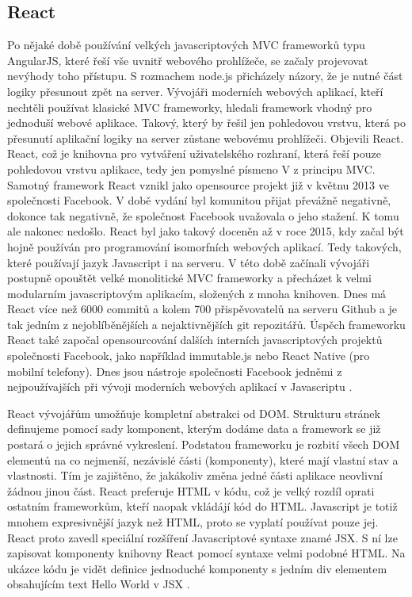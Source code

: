 \subsection{React}
\label{sec:react}
Po nějaké době používání velkých javascriptových MVC frameworků typu AngularJS, které řeší vše uvnitř webového prohlížeče, se začaly projevovat nevýhody toho přístupu. S rozmachem node.js přicházely názory, že je nutné část logiky přesunout zpět na server. Vývojáři moderních webových aplikací, kteří nechtěli používat klasické MVC frameworky, hledali framework vhodný pro jednoduší webové aplikace. Takový, který by řešil jen pohledovou vrstvu, která po přesunutí aplikační logiky na server zůstane webovému prohlížeči. Objevili React. React, což je knihovna pro vytváření uživatelského rozhraní, která řeší pouze pohledovou vrstvu aplikace, tedy jen pomyslné písmeno V z principu MVC. Samotný framework React vznikl jako opensource projekt již v květnu 2013 ve společnosti Facebook. V době vydání byl komunitou přijat převážně negativně, dokonce tak negativně, že společnost Facebook uvažovala o jeho stažení. K tomu ale nakonec nedošlo. React byl jako takový doceněn až v roce 2015, kdy začal být hojně používán pro programování isomorfních webových aplikací. Tedy takových, které používají jazyk Javascript i na serveru. V této době začínali vývojáři postupně opouštět velké monolitické MVC frameworky a přecházet k velmi modularním javascriptovým aplikacím, složených z mnoha knihoven. Dnes má React více než 6000 commitů a kolem 700 přispěvovatelů na serveru Github a je tak jedním z nejoblíběnějších a nejaktivnějších git repozitářů. Úspěch frameworku React také započal opensourcování dalších interních javascriptových projektů společnosti Facebook, jako například immutable.js nebo React Native (pro mobilní telefony). Dnes jsou nástroje společnosti Facebook jedněmi z nejpoužívajších při vývoji moderních webových aplikací v Javascriptu \cite{spa_horyna} \cite{react} \cite{react_book}.

React vývojářům umožňuje kompletní abstrakci od DOM. Strukturu stránek definujeme pomocí sady komponent, kterým dodáme data a framework se již postará o jejich správné vykreslení. Podstatou frameworku je rozbití všech DOM elementů na co nejmenší, nezávislé části (komponenty), které mají vlastní stav a vlastnosti. Tím je zajištěno, že jakákoliv změna jedné části aplikace neovlivní žádnou jinou část. React preferuje HTML v kódu, což je velký rozdíl oprati ostatním frameworkům, kteří naopak vkládájí kód do HTML. Javascript je totiž mnohem expresivnější jazyk než HTML, proto se vyplatí používat pouze jej. React proto zavedl speciální rozšíření Javascriptové syntaxe znamé JSX. S ní lze zapisovat komponenty knihovny React pomocí syntaxe velmi podobné HTML. Na ukázce kódu je vidět definice jednoduché komponenty s jedním div elementem obsahujícím text Hello World v JSX \cite{react} \cite{react_book} \cite{react_intro}.

